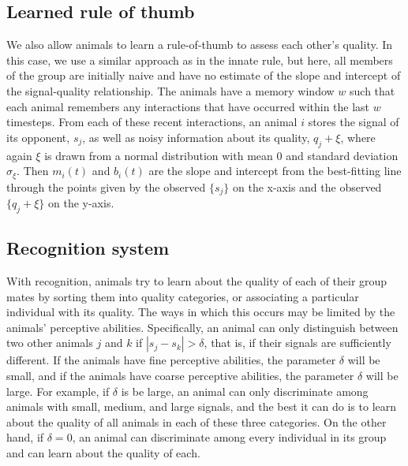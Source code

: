 \subsection*{Learned rule of thumb}
We also allow animals to learn a rule-of-thumb to assess each other's quality. In this case, we use a similar approach as in the innate rule, but here, all members of the group are initially naive and have no estimate of the slope and intercept of the signal-quality relationship. The animals have a memory window $w$ such that each animal remembers any interactions that have occurred within the last $w$ timesteps. From each of these recent interactions, an animal $i$ stores the signal of its opponent, $s_j$, as well as noisy information about its quality, $q_j+\xi$, where again $\xi$ is drawn from a normal distribution with mean $0$ and standard deviation $\sigma_\xi$.  Then $m_i(t)$ and $b_i(t)$ are the slope and intercept from the best-fitting line through the points given by the observed $\{s_j\}$ on the x-axis and the observed $\{q_j+\xi\}$ on the y-axis.   

\subsection*{Recognition system}
With recognition, animals try to learn about the quality of each of their group mates by sorting them into quality categories, or associating a particular individual with its quality. The ways in which this occurs may be limited by the animals' perceptive abilities. Specifically, an animal can only distinguish between two other animals $j$ and $k$ if $|s_j-s_k|>\delta$, that is, if their signals are sufficiently different. If the animals have fine perceptive abilities, the parameter $\delta$ will be small, and if the animals have coarse perceptive abilities, the parameter $\delta$ will be large. For example, if $\delta$ is be large, an animal can only discriminate among animals with small, medium, and large signals, and the best it can do is to learn about the quality of all animals in each of these three categories. On the other hand, if $\delta=0$, an animal can discriminate among every individual in its group and can learn about the quality of each. 

